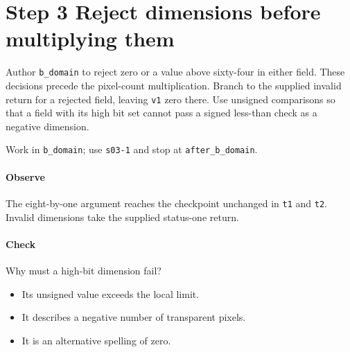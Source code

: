 \section{Step 3 Reject dimensions before multiplying them}\label{qoi-s03}
Author \texttt{b\_domain} to reject zero or a value above sixty-four in either field. These decisions precede the pixel-count multiplication. Branch to the supplied invalid return for a rejected field, leaving \texttt{v1} zero there. Use unsigned comparisons so that a field with its high bit set cannot pass a signed less-than check as a negative dimension.

Work in \texttt{b\_domain}; use \texttt{s03-1} and stop at \texttt{after\_b\_domain}.

\paragraph{Observe} The eight-by-one argument reaches the checkpoint unchanged in \texttt{t1} and \texttt{t2}. Invalid dimensions take the supplied status-one return.

\paragraph{Check} Why must a high-bit dimension fail?
\begin{itemize}
  \item[A.] Its unsigned value exceeds the local limit.
  \item[B.] It describes a negative number of transparent pixels.
  \item[C.] It is an alternative spelling of zero.
\end{itemize}
